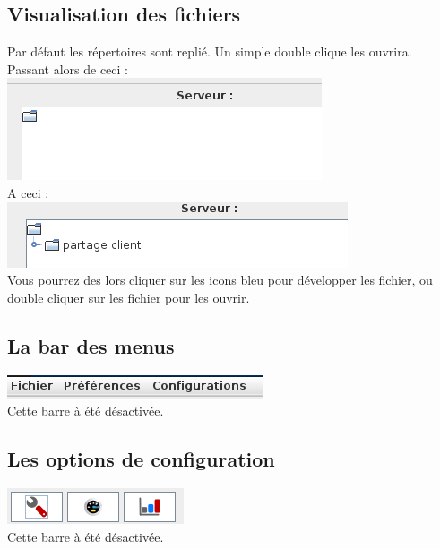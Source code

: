 \documentclass[12pt,a4paper]{article}
\begin{document}
\subsection{Visualisation des fichiers}
\begin{center}
	Par défaut les répertoires sont replié. Un simple double clique les ouvrira. \\
	Passant alors de ceci : \\
	\includegraphics[scale=0.5]{images/fichier.png} \\

	A ceci : \\
	\includegraphics[scale=0.5]{images/dev.png} \\
	
	Vous pourrez des lors cliquer sur les icons bleu pour développer les fichier, ou double cliquer sur les fichier pour les ouvrir.
	
\end{center}
\subsection{La bar des menus}

\begin{center}
	\includegraphics[scale=0.5]{images/menu.png} \\
	Cette barre à été désactivée.
\end{center}

\subsection{Les options de configuration}
\begin{center}
	\includegraphics[scale=0.5]{images/option.png} \\
	Cette barre à été désactivée.
\end{center}
\end{document}
